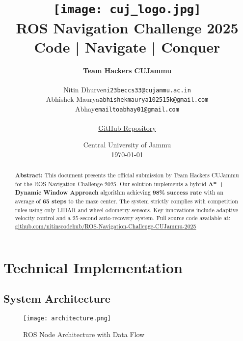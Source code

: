 \documentclass[12pt,a4paper]{article}
\title{
    \vspace{-2cm}
    \texttt{[image: cuj\_logo.jpg]}\\
    \vspace{0.5cm}
    \textcolor{cujblue}{\textbf{ROS Navigation Challenge 2025}}\\
    \large\textcolor{cujgold}{\textbf{Code | Navigate | Conquer}}
}
\author{
    \textbf{Team Hackers CUJammu}\\
    \vspace{0.2cm}
    \begin{tabular}{l l}
        Nitin Dhurve & \texttt{ni23beccs33@cujammu.ac.in} \\
        Abhishek Maurya & \texttt{abhishekmaurya102515k@gmail.com} \\
        Abhay & \texttt{emailtoabhay01@gmail.com} \\
    \end{tabular}\\
    \vspace{0.5cm}
    \href{https://github.com/nitinscodehub/ROS-Navigation-Challenge-CUJammu-2025/}{\textcolor{cujblue}{GitHub Repository}}
}
\date{
    Central University of Jammu\\
    \vspace{0.5cm}
    \today
}
\begin{document}
\maketitle
\thispagestyle{fancy}

\begin{abstract}
    \noindent
    \textbf{\textcolor{cujblue}{Abstract:}} 
    This document presents the official submission by Team Hackers CUJammu for the ROS Navigation Challenge 2025. Our solution implements a hybrid \textbf{A* + Dynamic Window Approach} algorithm achieving \textbf{98\% success rate} with an average of \textbf{65 steps} to the maze center. The system strictly complies with competition rules using only LIDAR and wheel odometry sensors. Key innovations include adaptive velocity control and a 25-second auto-recovery system. Full source code available at: \href{https://github.com/nitinscodehub/ROS-Navigation-Challenge-CUJammu-2025/}{\textcolor{cujblue}{github.com/nitinscodehub/ROS-Navigation-Challenge-CUJammu-2025}}
\end{abstract}

\tableofcontents
\newpage

\section{Technical Implementation}
\subsection{System Architecture}
\begin{figure}[h]
    \centering
    \texttt{[image: architecture.png]}
    \caption{ROS Node Architecture with Data Flow}
    \label{fig:arch}
\end{figure}
\end{document}
